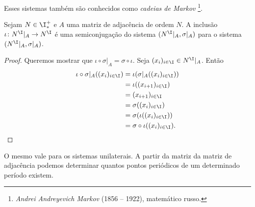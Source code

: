 Esses sistemas também são conhecidos como \emph{cadeias de Markov} \footnote{\emph{Andrei Andreyevich Markov} (1856 -- 1922), matemático russo.}.

\begin{proposition}
Sejam $N \in \I^+_*$ e $A$ uma matriz de adjacência de ordem $N$. A inclusão $\iota\colon N^\I|_A \to N^\I$ é uma semiconjugação do sistema $(N^\I|_A,\sigma|_A)$ para o sistema $(N^\I|_A,\sigma|_A)$.
\end{proposition}
\begin{proof}
Queremos mostrar que $\iota \circ \sigma|_A = \sigma \circ \iota$. Seja $(x_i)_{i \in \I} \in N^\I|_A$. Então
	\begin{align*}
	\iota \circ \sigma|_A ((x_i)_{i \in \I}) &= \iota (\sigma|_A((x_i)_{i \in \I})) \\
		&= \iota((x_{i+1})_{i \in \I}) \\
		&= (x_{i+1})_{i \in \I} \\
		&= \sigma ((x_i)_{i \in \I}) \\
		&= \sigma (\iota((x_i)_{i \in \I})) \\
		& =\sigma \circ \iota ((x_i)_{i \in \I}).
	\end{align*}
\end{proof}

O mesmo vale para os sistemas unilaterais. A partir da matriz da matriz de adjacência podemos determinar quantos pontos periódicos de um determinado período existem.

